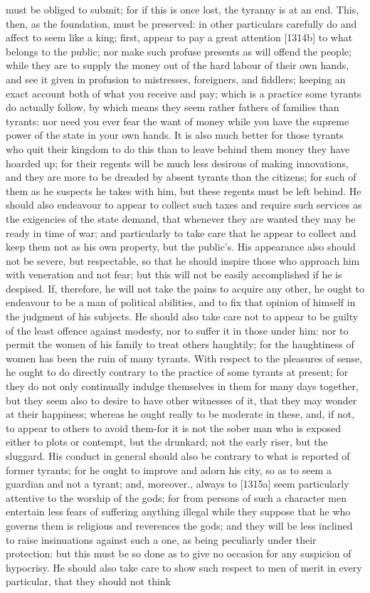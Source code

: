 \documentclass[12pt]{article}
\begin{document}
must be obliged to submit; for if this is once lost, the tyranny is at an end. This, then, as the foundation, must be preserved: in other particulars carefully do and affect to seem like a king; first, appear to pay a great attention [1314b] to what belongs to the public; nor make such profuse presents as will offend the people; while they are to supply the money out of the hard labour of their own hands, and see it given in profusion to mistresses, foreigners, and fiddlers; keeping an exact account both of what you receive and pay; which is a practice some tyrants do actually follow, by which means they seem rather fathers of families than tyrants: nor need you ever fear the want of money while you have the supreme power of the state in your own hands. It is also much better for those tyrants who quit their kingdom to do this than to leave behind them money they have hoarded up; for their regents will be much less desirous of making innovations, and they are more to be dreaded by absent tyrants than the citizens; for such of them as he suspects he takes with him, but these regents must be left behind. He should also endeavour to appear to collect such taxes and require such services as the exigencies of the state demand, that whenever they are wanted they may be ready in time of war; and particularly to take care that he appear to collect and keep them not as his own property, but the public's. His appearance also should not be severe, but respectable, so that he should inspire those who approach him with veneration and not fear; but this will not be easily accomplished if he is despised. If, therefore, he will not take the pains to acquire any other, he ought to endeavour to be a man of political abilities, and to fix that opinion of himself in the judgment of his subjects. He should also take care not to appear to be guilty of the least offence against modesty, nor to suffer it in those under him: nor to permit the women of his family to treat others haughtily; for the haughtiness of women has been the ruin of many tyrants. With respect to the pleasures of sense, he ought to do directly contrary to the practice of some tyrants at present; for they do not only continually indulge themselves in them for many days together, but they seem also to desire to have other witnesses of it, that they may wonder at their happiness; whereas he ought really to be moderate in these, and, if not, to appear to others to avoid them-for it is not the sober man who is exposed either to plots or contempt, but the drunkard; not the early riser, but the sluggard. His conduct in general should also be contrary to what is reported of former tyrants; for he ought to improve and adorn his city, so as to seem a guardian and not a tyrant; and, moreover., always to [1315a] seem particularly attentive to the worship of the gods; for from persons of such a character men entertain less fears of suffering anything illegal while they suppose that he who governs them is religious and reverences the gods; and they will be less inclined to raise insinuations against such a one, as being peculiarly under their protection: but this must be so done as to give no occasion for any suspicion of hypocrisy. He should also take care to show such respect to men of merit in every particular, that they should not think 
\end{document}
